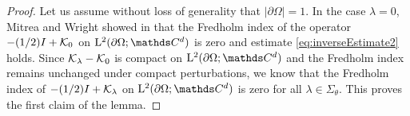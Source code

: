 \begin{proof}
  Let us assume without loss of generality that $|\partial\Omega| = 1$.
  In the case $\lambda = 0$, Mitrea and Wright showed in \cite[Eq. (5.166)]{mitreaWright} that the Fredholm index of the operator $-(1/2)I + \mathcal{K}_0$ on $\Ell^2(\partial\Omega; \C^d)$ is zero and estimate \eqref{eq:inverseEstimate2} holds.
  Since $\mathcal{K}_\lambda - \mathcal{K}_0$ is compact on $\Ell^2(\partial\Omega; \C^d)$ and the Fredholm index remains unchanged under compact perturbations, we know that the Fredholm index of $-(1/2)I + \mathcal{K}_\lambda$ on $\Ell^2(\partial\Omega; \C^d)$ is zero for all $\lambda \in \Sigma_\theta$.
  This proves the first claim of the lemma.


\end{proof}
